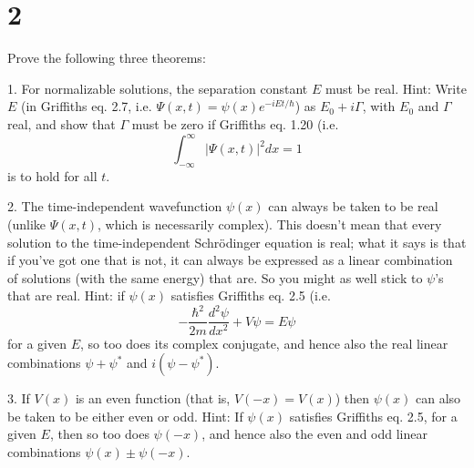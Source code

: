 \documentclass{article}
\begin{document}
\newpage

\section*{2}
\begin{ques}\label{q2}
Prove the following three theorems:

1. For normalizable solutions, the separation constant $E$ must be real. Hint: Write $E$
(in Griffiths eq. 2.7, i.e. $\Psi(x, t) = \psi(x)e^{-iEt/\hbar}$) as $E_0 + i\Gamma$, with $E_0$ and $\Gamma$ real, and
show that $\Gamma$ must be zero if Griffiths eq. 1.20 (i.e.
\[
\int_{-\infty}^{\infty} |\Psi(x, t)|^2 dx = 1
\]
is to hold for all $t$.

2. The time-independent wavefunction $\psi(x)$ can always be taken to be real (unlike
$\Psi(x, t)$, which is necessarily complex). This doesn’t mean that every solution to the
time-independent Schrödinger equation is real; what it says is that if you’ve got one
that is not, it can always be expressed as a linear combination of solutions (with the
same energy) that are. So you might as well stick to $\psi$’s that are real. Hint: if $\psi(x)$
satisfies Griffiths eq. 2.5 (i.e.
\[
-\frac{\hbar^2}{2m}\frac{d^2\psi}{dx^2} + V\psi = E\psi
\]
for a given $E$, so too does its complex conjugate, and hence also the real linear combinations
$\psi+\psi^*$ and $i(\psi-\psi^*)$.

3. If $V(x)$ is an even function (that is, $V(-x) = V(x)$) then $\psi(x)$ can also be taken to
be either even or odd. Hint: If $\psi(x)$ satisfies Griffiths eq. 2.5, for a given $E$, then so
too does $\psi(-x)$, and hence also the even and odd linear combinations $\psi(x)\pm\psi(-x)$.
\end{ques}
\end{document}
